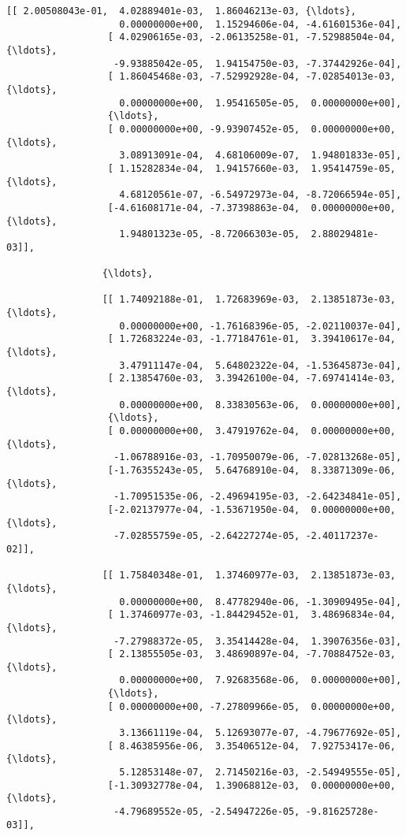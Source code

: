 \documentclass[11pt]{article}
\begin{document}
\begin{Verbatim}[commandchars=\\\{\}]
                 [[ 2.00508043e-01,  4.02889401e-03,  1.86046213e-03, {\ldots},
                    0.00000000e+00,  1.15294606e-04, -4.61601536e-04],
                  [ 4.02906165e-03, -2.06135258e-01, -7.52988504e-04, {\ldots},
                   -9.93885042e-05,  1.94154750e-03, -7.37442926e-04],
                  [ 1.86045468e-03, -7.52992928e-04, -7.02854013e-03, {\ldots},
                    0.00000000e+00,  1.95416505e-05,  0.00000000e+00],
                  {\ldots},
                  [ 0.00000000e+00, -9.93907452e-05,  0.00000000e+00, {\ldots},
                    3.08913091e-04,  4.68106009e-07,  1.94801833e-05],
                  [ 1.15282834e-04,  1.94157660e-03,  1.95414759e-05, {\ldots},
                    4.68120561e-07, -6.54972973e-04, -8.72066594e-05],
                  [-4.61608171e-04, -7.37398863e-04,  0.00000000e+00, {\ldots},
                    1.94801323e-05, -8.72066303e-05,  2.88029481e-03]],
          
                 {\ldots},
          
                 [[ 1.74092188e-01,  1.72683969e-03,  2.13851873e-03, {\ldots},
                    0.00000000e+00, -1.76168396e-05, -2.02110037e-04],
                  [ 1.72683224e-03, -1.77184761e-01,  3.39410617e-04, {\ldots},
                    3.47911147e-04,  5.64802322e-04, -1.53645873e-04],
                  [ 2.13854760e-03,  3.39426100e-04, -7.69741414e-03, {\ldots},
                    0.00000000e+00,  8.33830563e-06,  0.00000000e+00],
                  {\ldots},
                  [ 0.00000000e+00,  3.47919762e-04,  0.00000000e+00, {\ldots},
                   -1.06788916e-03, -1.70950079e-06, -7.02813268e-05],
                  [-1.76355243e-05,  5.64768910e-04,  8.33871309e-06, {\ldots},
                   -1.70951535e-06, -2.49694195e-03, -2.64234841e-05],
                  [-2.02137977e-04, -1.53671950e-04,  0.00000000e+00, {\ldots},
                   -7.02855759e-05, -2.64227274e-05, -2.40117237e-02]],
          
                 [[ 1.75840348e-01,  1.37460977e-03,  2.13851873e-03, {\ldots},
                    0.00000000e+00,  8.47782940e-06, -1.30909495e-04],
                  [ 1.37460977e-03, -1.84429452e-01,  3.48696834e-04, {\ldots},
                   -7.27988372e-05,  3.35414428e-04,  1.39076356e-03],
                  [ 2.13855505e-03,  3.48690897e-04, -7.70884752e-03, {\ldots},
                    0.00000000e+00,  7.92683568e-06,  0.00000000e+00],
                  {\ldots},
                  [ 0.00000000e+00, -7.27809966e-05,  0.00000000e+00, {\ldots},
                    3.13661119e-04,  5.12693077e-07, -4.79677692e-05],
                  [ 8.46385956e-06,  3.35406512e-04,  7.92753417e-06, {\ldots},
                    5.12853148e-07,  2.71450216e-03, -2.54949555e-05],
                  [-1.30932778e-04,  1.39068812e-03,  0.00000000e+00, {\ldots},
                   -4.79689552e-05, -2.54947226e-05, -9.81625728e-03]],
          

\end{Verbatim}
\end{document}
